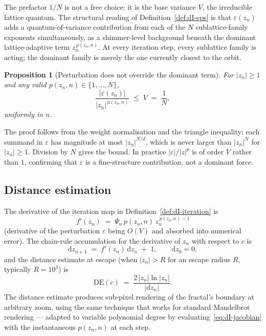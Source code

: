 \documentclass[11pt,a4paper]{article}
\newtheorem{proposition}[theorem]{Proposition}
\theoremstyle{definition}
\theoremstyle{remark}
\begin{document}
The prefactor $1/N$ is not a free choice; it is the base variance $V$, the irreducible lattice quantum. The structural reading of Definition~\ref{def:dI-eps} is that $\varepsilon(z_{n})$ adds a quantum-of-variance contribution from each of the $N$ sublattice-family exponents simultaneously, as a shimmer-level background beneath the dominant lattice-adaptive term $z_{n}^{\,p(z_{n},n)}$. At every iteration step, every sublattice family is acting; the dominant family is merely the one currently closest to the orbit.

\begin{proposition}[Perturbation does not override the dominant term]
For $|z_{n}|\geq 1$ and any valid $p(z_{n},n)\in\{1,\ldots,N\}$,
\[
\frac{|\varepsilon(z_{n})|}{|z_{n}|^{\,p(z_{n},n)}} \;\leq\; V \;=\; \frac{1}{N},
\]
uniformly in $n$.
\end{proposition}

The proof follows from the weight normalisation and the triangle inequality: each summand in $\varepsilon$ has magnitude at most $|z_{n}|^{N/d}$, which is never larger than $|z_{n}|^{N}$ for $|z_{n}|\geq 1$. Division by $N$ gives the bound. In practice $|\varepsilon|/|z|^{p}$ is of order $V$ rather than $1$, confirming that $\varepsilon$ is a fine-structure contribution, not a dominant force.

\subsection{Distance estimation}

The derivative of the iteration map in Definition~\ref{def:dI-iteration} is
\begin{equation}
f'(z_{n}) \;=\; \Psi_{n}\,p(z_{n},n)\,z_{n}^{\,p(z_{n},n)-1}
\label{eq:dI-jacobian}
\end{equation}
(derivative of the perturbation $\varepsilon$ being $O(V)$ and absorbed into numerical error). The chain-rule accumulation for the derivative of $z_{n}$ with respect to $c$ is
\begin{equation}
\mathrm{d}z_{n+1} \;=\; f'(z_{n})\,\mathrm{d}z_{n} \;+\; 1, \qquad \mathrm{d}z_{0}=0,
\end{equation}
and the distance estimate at escape (when $|z_{n}|>R$ for an escape radius $R$, typically $R=10^{3}$) is
\begin{equation}
\mathrm{DE}(c) \;=\; \frac{2\,|z_{n}|\ln|z_{n}|}{|\mathrm{d}z_{n}|}.
\label{eq:dI-DE}
\end{equation}
The distance estimate produces sub-pixel rendering of the fractal's boundary at arbitrary zoom, using the same technique that works for standard Mandelbrot rendering --- adapted to variable polynomial degree by evaluating~\eqref{eq:dI-jacobian} with the instantaneous $p(z_{n},n)$ at each step.
\end{document}
